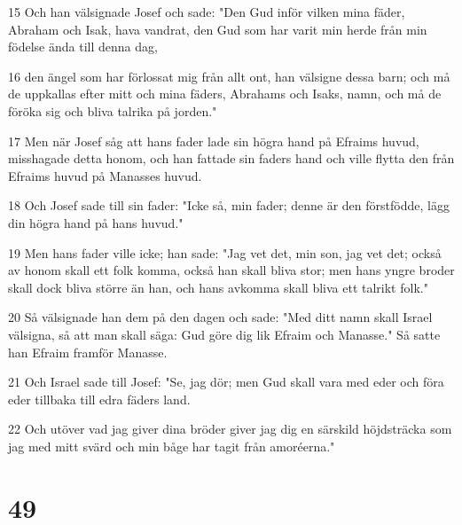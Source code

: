 \par 15 Och han välsignade Josef och sade: "Den Gud inför vilken mina fäder, Abraham och Isak, hava vandrat, den Gud som har varit min herde från min födelse ända till denna dag,
\par 16 den ängel som har förlossat mig från allt ont, han välsigne dessa barn; och må de uppkallas efter mitt och mina fäders, Abrahams och Isaks, namn, och må de föröka sig och bliva talrika på jorden."
\par 17 Men när Josef såg att hans fader lade sin högra hand på Efraims huvud, misshagade detta honom, och han fattade sin faders hand och ville flytta den från Efraims huvud på Manasses huvud.
\par 18 Och Josef sade till sin fader: "Icke så, min fader; denne är den förstfödde, lägg din högra hand på hans huvud."
\par 19 Men hans fader ville icke; han sade: "Jag vet det, min son, jag vet det; också av honom skall ett folk komma, också han skall bliva stor; men hans yngre broder skall dock bliva större än han, och hans avkomma skall bliva ett talrikt folk."
\par 20 Så välsignade han dem på den dagen och sade: "Med ditt namn skall Israel välsigna, så att man skall säga: Gud göre dig lik Efraim och Manasse." Så satte han Efraim framför Manasse.
\par 21 Och Israel sade till Josef: "Se, jag dör; men Gud skall vara med eder och föra eder tillbaka till edra fäders land.
\par 22 Och utöver vad jag giver dina bröder giver jag dig en särskild höjdsträcka som jag med mitt svärd och min båge har tagit från amoréerna."

\chapter{49}

